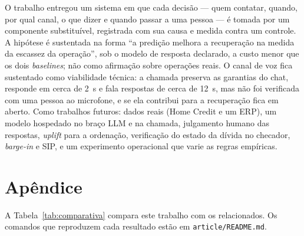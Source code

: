 \documentclass[portuguese]{sbcreviews-2025}%
\begin{document}
O trabalho entregou um sistema em que cada decisão --- quem contatar, quando, por qual canal, o que dizer e quando passar a uma pessoa --- é tomada por um componente substituível, registrada com sua causa e medida contra um controle. A hipótese é sustentada na forma ``a predição melhora a recuperação na medida da escassez da operação'', sob o modelo de resposta declarado, a custo menor que os dois \textit{baselines}; não como afirmação sobre operações reais. O canal de voz fica sustentado como viabilidade técnica: a chamada preserva as garantias do chat, responde em cerca de 2~s e fala respostas de cerca de 12~s, mas não foi verificada com uma pessoa ao microfone, e se ela contribui para a recuperação fica em aberto. Como trabalhos futuros: dados reais (Home Credit e um ERP), um modelo hospedado no braço LLM e na chamada, julgamento humano das respostas, \textit{uplift} para a ordenação, verificação do estado da dívida no checador, \textit{barge-in} e SIP, e um experimento operacional que varie as regras empíricas.

\section{Apêndice}
\label{sec:apendice}

A Tabela~\ref{tab:comparativa} compara este trabalho com os relacionados. Os comandos que reproduzem cada resultado estão em \texttt{article/README.md}.
\end{document}
